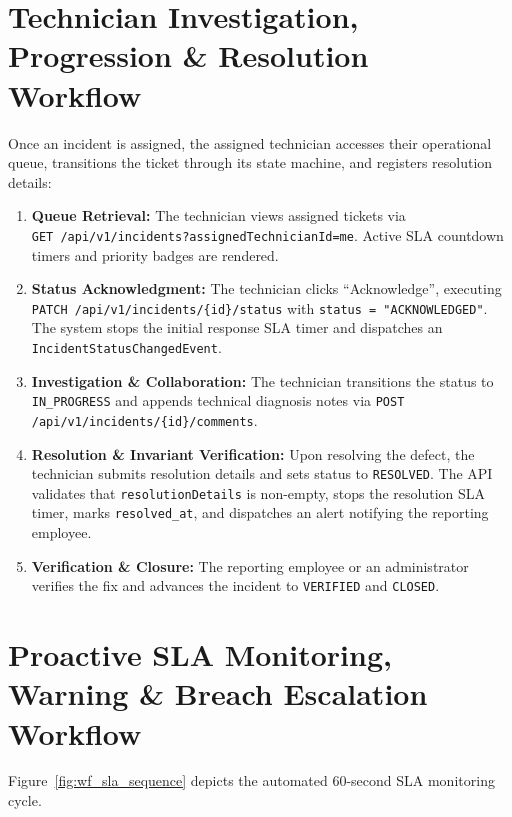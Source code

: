 \documentclass[11pt,a4paper,oneside]{report}
\begin{document}
\section{Technician Investigation, Progression \& Resolution Workflow}
\label{sec:wf_technician_progression}
Once an incident is assigned, the assigned technician accesses their operational queue, transitions the ticket through its state machine, and registers resolution details:
\begin{enumerate}
    \item \textbf{Queue Retrieval:} The technician views assigned tickets via \\ \texttt{GET /api/v1/incidents?assignedTechnicianId=me}. Active SLA countdown timers and priority badges are rendered.
    \item \textbf{Status Acknowledgment:} The technician clicks ``Acknowledge'', executing \texttt{PATCH /api/v1/incidents/\{id\}/status} with \texttt{status = "ACKNOWLEDGED"}. The system stops the initial response SLA timer and dispatches an \texttt{IncidentStatusChangedEvent}.
    \item \textbf{Investigation \& Collaboration:} The technician transitions the status to \texttt{IN\_PROGRESS} and appends technical diagnosis notes via \texttt{POST /api/v1/incidents/\{id\}/comments}.
    \item \textbf{Resolution \& Invariant Verification:} Upon resolving the defect, the technician submits resolution details and sets status to \texttt{RESOLVED}. The API validates that \texttt{resolutionDetails} is non-empty, stops the resolution SLA timer, marks \texttt{resolved\_at}, and dispatches an alert notifying the reporting employee.
    \item \textbf{Verification \& Closure:} The reporting employee or an administrator verifies the fix and advances the incident to \texttt{VERIFIED} and \texttt{CLOSED}.
\end{enumerate}

\section{Proactive SLA Monitoring, Warning \& Breach Escalation Workflow}
\label{sec:wf_sla_escalation}
Figure~\ref{fig:wf_sla_sequence} depicts the automated 60-second SLA monitoring cycle.
\end{document}
